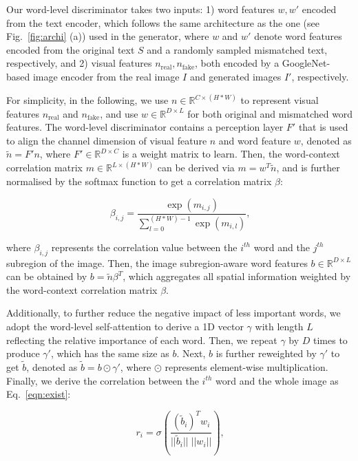 Our word-level discriminator takes two inputs: 1) word features $w, {w}'$ encoded from the text encoder, which follows the same architecture as the one (see Fig.~\ref{fig:archi} (a)) used in the generator, where $w$ and $w'$ denote word features {encoded from} the original text $S$ and a randomly sampled mismatched text, {respectively}, and 2) visual features $n_\text{real}, n_\text{fake}$, both encoded by a GoogleNet-based \cite{szegedy2015going} image encoder from the real image $I$ and generated images $I'$, respectively. 

For simplicity, in the following, we use $n \in \mathbb{R}^{C \times (H \ast W)}$ to represent visual features $n_\text{real}$ and $n_\text{fake}$, and use $w \in \mathbb{R}^{D \times L}$ for both original and mismatched word features. The word-level discriminator contains a perception layer $F'$ that is used to align the channel dimension of visual feature $n$ and word feature $w$, denoted as $\tilde{n} = {F'}n$, where ${F}' \in \mathbb{R}^{D \times C}$ is a weight matrix to learn. Then, the word-context correlation matrix $m \in \mathbb{R}^{L\times (H \ast W)}$ can be derived via $m = w^T\tilde{n}$, and is further normalised by the softmax function to get a correlation matrix $\beta$:

\begin{equation}
\beta _{i,j}=\frac{\exp(m_{i,j})}{\sum^{(H \ast W)-1}_{l=0}\exp(m_{i,l})}
\textrm{,}
\label{eq:correlation}
\end{equation}

where $\beta_{i,j}$ represents the correlation value between the \(i^{th}\) word and the \(j^{th}\) subregion of the image. Then, the image subregion-aware word features $b \in \mathbb{R}^{D\times L}$ can be obtained by $b = \tilde{n}\beta^T$, which aggregates all spatial information weighted by the word-context correlation matrix $\beta$.

Additionally, to further reduce the negative impact of less important words, we adopt the word-level self-attention \cite{nam2018text} to derive a 1D vector $\gamma$ with length $L$ reflecting the relative importance of each word. Then, we repeat $\gamma$ by $D$ times to produce ${\gamma}'$, which {has} the same size as $b$. Next, $b$ is further reweighted by $\gamma'$ to get $\tilde{b}$, denoted as $\tilde{b} = {b}\odot {\gamma}'$, where $\odot$ represents element-wise multiplication. Finally, we derive the correlation between the $i^{th}$ word and the whole image as Eq.~\eqref{eqn:exist}:

\begin{equation}
r_{i}=\sigma (\frac{(\tilde{b}_i)^{T}w_{i}}{||\tilde{b}_{i}  ||\;|| w_{i} ||})
\textrm{,}
\label{eqn:exist}
\end{equation}

